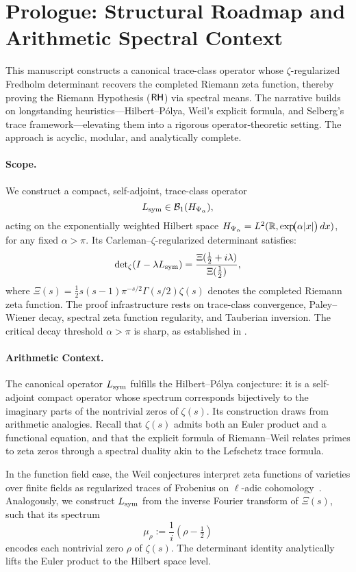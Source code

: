 \section*{Prologue: Structural Roadmap and Arithmetic Spectral Context}
\label{sec:prologue}

\medskip

\noindent
This manuscript constructs a canonical trace-class operator whose \(\zeta\)-regularized Fredholm determinant recovers the completed Riemann zeta function, thereby proving the Riemann Hypothesis (\(\mathsf{RH}\)) via spectral means. The narrative builds on longstanding heuristics—Hilbert--Pólya, Weil's explicit formula, and Selberg's trace framework—elevating them into a rigorous operator-theoretic setting. The approach is acyclic, modular, and analytically complete.

\paragraph*{Scope.}
We construct a compact, self-adjoint, trace-class operator
\[
L_{\mathrm{sym}} \in \mathcal{B}_1(H_{\Psi_\alpha}),
\]
acting on the exponentially weighted Hilbert space \( H_{\Psi_\alpha} = L^2(\mathbb{R}, \exp\!\bigl(\alpha |x|\bigr)\,dx) \), for any fixed \( \alpha > \pi \). Its Carleman--\(\zeta\)-regularized determinant satisfies:
\[
\det\nolimits_{\zeta}(I - \lambda L_{\mathrm{sym}}) = \frac{\Xi(\tfrac{1}{2} + i\lambda)}{\Xi(\tfrac{1}{2})},
\]
where \( \Xi(s) = \tfrac{1}{2}s(s-1)\pi^{-s/2} \Gamma(s/2) \zeta(s) \) denotes the completed Riemann zeta function. The proof infrastructure rests on trace-class convergence, Paley--Wiener decay, spectral zeta function regularity, and Tauberian inversion. The critical decay threshold \( \alpha > \pi \) is sharp, as established in .

\paragraph*{Arithmetic Context.}
The canonical operator \( L_{\mathrm{sym}} \) fulfills the Hilbert--Pólya conjecture: it is a self-adjoint compact operator whose spectrum corresponds bijectively to the imaginary parts of the nontrivial zeros of \( \zeta(s) \). Its construction draws from arithmetic analogies. Recall that \( \zeta(s) \) admits both an Euler product and a functional equation, and that the explicit formula of Riemann--Weil relates primes to zeta zeros through a spectral duality akin to the Lefschetz trace formula.

In the function field case, the Weil conjectures interpret zeta functions of varieties over finite fields as regularized traces of Frobenius on \(\ell\)-adic cohomology~\cite{Deligne1971WeilI}. Analogously, we construct \( L_{\mathrm{sym}} \) from the inverse Fourier transform of \( \Xi(s) \), such that its spectrum
\[
\mu_\rho := \frac{1}{i}(\rho - \tfrac{1}{2})
\]
encodes each nontrivial zero \( \rho \) of \( \zeta(s) \). The determinant identity analytically lifts the Euler product to the Hilbert space level.

